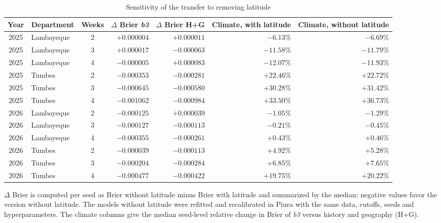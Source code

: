 \documentclass[10pt]{article}
\newcommand{\bthree}{\textit{b3}}
\begin{document}
\begin{table}[!h]
\centering
\caption{Sensitivity of the transfer to removing latitude}
\small
\begin{tabular}{@{}clcrrrr@{}}
\toprule
Year & Department & Weeks & $\Delta$ Brier \bthree{} & $\Delta$ Brier H+G & Climate, with latitude & Climate, without latitude\\
\midrule
2025 & Lambayeque & 2 & $+0.000004$ & $+0.000011$ & $-6.13\%$ & $-6.69\%$\\
2025 & Lambayeque & 3 & $+0.000017$ & $-0.000063$ & $-11.58\%$ & $-11.79\%$\\
2025 & Lambayeque & 4 & $-0.000005$ & $+0.000083$ & $-12.07\%$ & $-11.93\%$\\
2025 & Tumbes & 2 & $-0.000353$ & $-0.000281$ & $+22.46\%$ & $+22.72\%$\\
2025 & Tumbes & 3 & $-0.000645$ & $-0.000580$ & $+30.28\%$ & $+31.42\%$\\
2025 & Tumbes & 4 & $-0.001062$ & $-0.000984$ & $+33.50\%$ & $+36.73\%$\\
2026 & Lambayeque & 2 & $-0.000125$ & $+0.000039$ & $-1.05\%$ & $-1.29\%$\\
2026 & Lambayeque & 3 & $-0.000127$ & $-0.000113$ & $-0.21\%$ & $-0.45\%$\\
2026 & Lambayeque & 4 & $-0.000355$ & $-0.000261$ & $+0.43\%$ & $+0.46\%$\\
2026 & Tumbes & 2 & $-0.000039$ & $-0.000113$ & $+4.92\%$ & $+5.28\%$\\
2026 & Tumbes & 3 & $-0.000204$ & $-0.000284$ & $+6.85\%$ & $+7.65\%$\\
2026 & Tumbes & 4 & $-0.000477$ & $-0.000422$ & $+19.75\%$ & $+20.22\%$\\
\bottomrule
\end{tabular}

\vspace{2pt}\parbox{0.9\textwidth}{\footnotesize $\Delta$ Brier is computed per seed as Brier without latitude minus Brier with latitude and summarized by the median; negative values favor the version without latitude. The models without latitude were refitted and recalibrated in Piura with the same data, cutoffs, seeds and hyperparameters. The climate columns give the median seed-level relative change in Brier of \bthree{} versus history and geography (H+G).}
\end{table}

\clearpage
\end{document}
